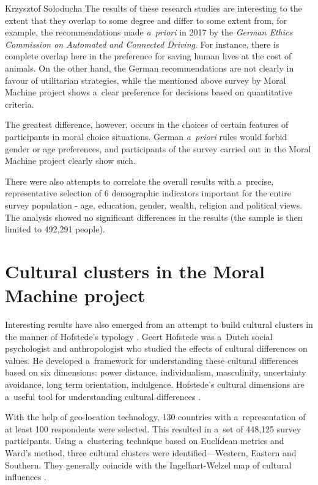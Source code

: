 \begin{artengenv}{Krzysztof Sołoducha}
The results of these research studies are interesting to the extent that they overlap to some degree and differ to some extent from, for example, the recommendations made \textit{a~priori} in 2017 by the \textit{German Ethics Commission on Automated and Connected Driving}. For instance, there is complete overlap here in the preference for saving human lives at the cost of animals. On the other hand, the German recommendations are not clearly in favour of utilitarian strategies, while the mentioned above survey by Moral Machine project shows a~clear preference for decisions based on quantitative criteria.

The greatest difference, however, occurs in the choices of certain features of participants in moral choice situations. German \textit{a~priori} rules would forbid gender or age preferences, and participants of the survey carried out in the Moral Machine project clearly show such.

There were also attempts to correlate the overall results with a~precise, representative selection of 6 demographic indicators important for the entire survey population - age, education, gender, wealth, religion and political views. The analysis showed no significant differences in the results (the sample is then limited to 492,291 people).

\section*{Cultural clusters in the Moral Machine project}
Interesting results have also emerged from an attempt to build cultural clusters in the manner of Hofstede's typology
\parencite[][]{hofstede_cultures_2010}. %
 Geert Hofstede was a~Dutch social psychologist and anthropologist who studied the effects of cultural differences on values. He developed a~framework for understanding these cultural differences based on six dimensions: power distance, individualism, masculinity, uncertainty avoidance, long term orientation, indulgence. Hofstede's cultural dimensions are a~useful tool for understanding cultural differences 
\parencite[][]{hofstede_geert_2011}.%


With the help of geo-location technology, 130 countries with a~representation of at least 100 respondents were selected. This resulted in a~set of 448,125 survey participants. Using a~clustering technique based on Euclidean metrics and Ward's method, three cultural clusters were identified—Western, Eastern and Southern. They generally coincide with the Ingelhart-Welzel map of cultural influences
\parencite[][]{inglehart_modernization_2005}.%



\end{artengenv}

